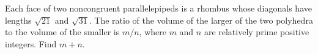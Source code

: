 %	










\begin{question}[name={2023 AIME I, \href{https://artofproblemsolving.com/community/c4p27048975}{Problem 13}}]
	Each face of two noncongruent parallelepipeds is a rhombus whose diagonals have lengths $\sqrt{21}$ and $\sqrt{31}$. The ratio of the volume of the larger of the two polyhedra to the volume of the smaller is $m/n$, where $m$ and $n$ are relatively prime positive integers. Find $m+n$. 
\end{question}



